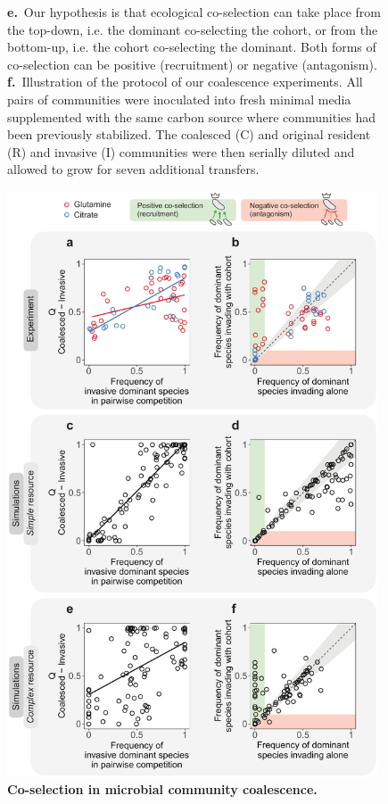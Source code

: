 \documentclass[a4paper,10pt]{article}
\begin{document}
\begin{figure}[!h]
{\textbf{e.}~Our hypothesis is that ecological co-selection can take place from the top-down,
i.e. the dominant co-selecting the cohort, or from the bottom-up, i.e. the cohort co-selecting
the dominant. Both forms of co-selection can be positive (recruitment) or negative
(antagonism).
\textbf{f.}~Illustration of the protocol of our coalescence experiments. All pairs of
communities were inoculated into fresh minimal media supplemented with the same carbon
source where communities had been previously stabilized. The coalesced (C) and original
resident (R) and invasive (I) communities were then serially diluted and allowed to grow
for seven additional transfers.}
\label{fig1}
\end{figure}

\clearpage

\begin{figure}[!h]
\centering
\internallinenumbers
\includegraphics[width=11cm,keepaspectratio]{figs/fig2.pdf}
\caption{\textbf{Co-selection in microbial community coalescence.}
}
\end{figure}
\end{document}
